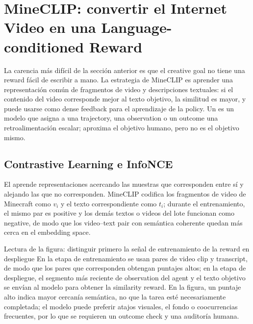 \section{MineCLIP: convertir el Internet Video en una Language-conditioned Reward}

La carencia más difícil de la sección anterior es que el creative goal no tiene una reward fácil de escribir a mano. La estrategia de MineCLIP es aprender una representación común de fragmentos de video y descripciones textuales: si el contenido del video corresponde mejor al texto objetivo, la similitud es mayor, y puede usarse como dense feedback para el aprendizaje de la policy. Un  es un modelo que asigna a una trajectory, una observation o un outcome una retroalimentación escalar; aproxima el objetivo humano, pero no es el objetivo mismo.

\subsection{Contrastive Learning e InfoNCE}

El  aprende representaciones acercando las muestras que corresponden entre sí y alejando las que no corresponden. MineCLIP codifica los fragmentos de video de Minecraft como $v_i$ y el texto correspondiente como $t_i$; durante el entrenamiento, el mismo par es positive y los demás textos o videos del lote funcionan como negative, de modo que los video--text pair con semántica coherente quedan más cerca en el embedding space.


\begin{knowledgebox}{Lectura de la figura: distinguir primero la señal de entrenamiento de la reward en despliegue}
En la etapa de entrenamiento se usan pares de video clip y transcript, de modo que los pares que corresponden obtengan puntajes altos; en la etapa de despliegue, el segmento más reciente de observation del agent y el texto objetivo se envían al modelo para obtener la similarity reward. En la figura, un puntaje alto indica mayor cercanía semántica, no que la tarea esté necesariamente completada; el modelo puede preferir atajos visuales, el fondo o coocurrencias frecuentes, por lo que se requieren un outcome check y una auditoría humana.
\end{knowledgebox}

